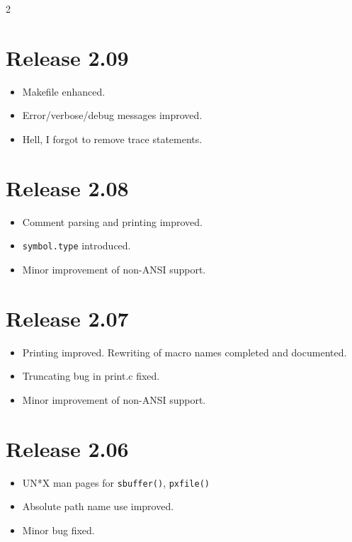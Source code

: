 \documentclass[11pt,a4paper]{scrartcl}
\newcommand\rsc[1]{\texttt{#1}}
\newcommand\File[1]{\textsf{#1}}
\newenvironment{Releases}{\begin{multicols}2\RaggedRight}{\end{multicols}}
\newenvironment{Release}[2]{%
  \def\tmp{#2}%
  \section*{Release #1 \ifx\tmp\empty\else{\normalsize[#2]}\fi}
  \begin{itemize}
}{\end{itemize}}
\newenvironment{Fix}[1]{\item }{}
\newenvironment{New}[1]{\item }{}
\newenvironment{Update}[1]{\item }{}
\begin{document}
\begin{Releases}
 \begin{Release}{2.09}{}
  \begin{Update}{gene}
    \File{Makefile} enhanced.
  \end{Update}
  \begin{Update}{gene}
    Error/verbose/debug messages improved.
  \end{Update}
  \begin{Fix}{gene}
    Hell, I forgot to remove trace statements.
  \end{Fix}
 \end{Release}

 \begin{Release}{2.08}{}
  \begin{Update}{gene}
    Comment parsing and printing improved.
  \end{Update}
  \begin{New}{gene}
    \rsc{symbol.type} introduced.
  \end{New}
  \begin{Update}{gene}
    Minor improvement of non-ANSI support.
  \end{Update}
 \end{Release}

 \begin{Release}{2.07}{}
  \begin{Update}{gene}
    Printing improved. Rewriting of macro names completed and
    documented.
  \end{Update}
  \begin{Fix}{gene}
    Truncating bug in \File{print.c} fixed.
  \end{Fix}
  \begin{Update}{gene}
    Minor improvement of non-ANSI support.
  \end{Update}
 \end{Release}

 \begin{Release}{2.06}{}
  \begin{New}{gene}
    UN*X man pages for \verb|sbuffer()|, \verb|pxfile()|
  \end{New}
  \begin{Update}{gene}
    Absolute path name use improved.
  \end{Update}
  \begin{Fix}{gene}
    Minor bug fixed.
  \end{Fix}
 \end{Release}


\end{Releases}
\end{document}
